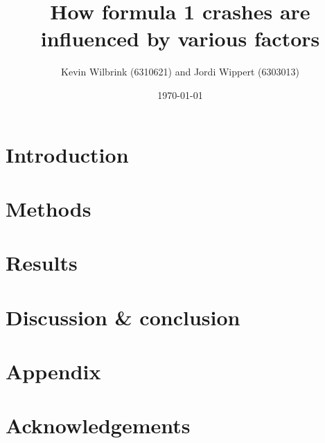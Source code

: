 \documentclass[12pt]{article}
\title{\textbf{How formula 1 crashes are influenced by various factors}}
\date{\today}
\author{Kevin Wilbrink (6310621) and Jordi Wippert (6303013)}
\begin{document}
	\maketitle

	\begin{multicols*}{2}
			\textbf{}


		\section{Introduction}
		

		\section{Methods}
		

		\section{Results}
		

    \section{Discussion \& conclusion}
		

		\section*{Appendix}
		

		\section*{Acknowledgements}
		

		
	\end{multicols*}
\end{document}
